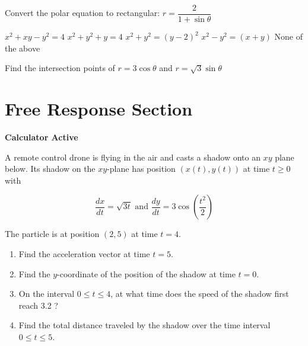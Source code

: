 \documentclass[11pt]{exam}
\begin{document}
\begin{questions}
\begin{minipage}{\linewidth}
\question Convert the polar equation to rectangular: $r = \dfrac{2}{1 + \sin \theta}$

\begin{choices}
	\choice $x^2 + xy - y^2 = 4$
	\choice $x^2+y^2 + y = 4$
	\correctchoice $x^2 + y^2 = (y-2)^2$
	\choice $x^2 - y^2 = (x+y)$
	\choice None of the above
\end{choices} \answerline
\end{minipage}

\begin{minipage}{\linewidth}


\question Find the intersection points of $r = 3 \cos \theta$ and $r = \sqrt3 \sin \theta$

\begin{choices}

\end{choices} \answerline
\end{minipage}

\end{questions}

\clearpage
\section*{Free Response Section}
\noindent
\textbf{Calculator Active}
\vspace{2ex}

A remote control drone is flying in the air and casts a shadow onto
an $xy$ plane below. Its shadow on the $x y$-plane has position $(x(t), y(t))$ at time $t \geq 0$ with

$$
\frac{d x}{d t}=\sqrt{3 t} \text { and } \frac{d y}{d t}=3 \cos \left(\frac{t^{2}}{2}\right)
$$

The particle is at position $(2,5)$ at time $t=4$.
\begin{enumerate}
\item Find the acceleration vector at time $t=5$.
\vspace{1in}
\item Find the $y$-coordinate of the position of the shadow at time $t=0$.
\vspace{1in}
\item On the interval $0 \leq t \leq 4$, at what time does the speed of the shadow first reach 3.2 ?
\vspace{2in}
\item Find the total distance traveled by the shadow over the time interval $0 \leq t \leq 5$.
\end{enumerate}
\end{document}
